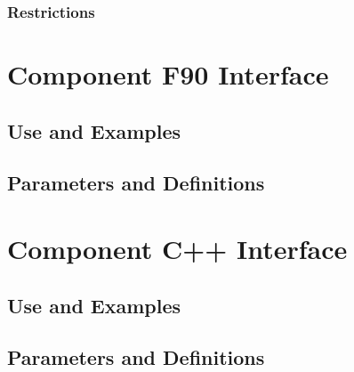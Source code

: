 \documentclass[]{article}
\begin{document}



\subsubsection{Restrictions}




\section{Component F90 Interface}

\subsection{Use and Examples}




\subsection{Parameters and Definitions}








\section{Component C++ Interface}

\subsection{Use and Examples}




\subsection{Parameters and Definitions}






\end{document}
